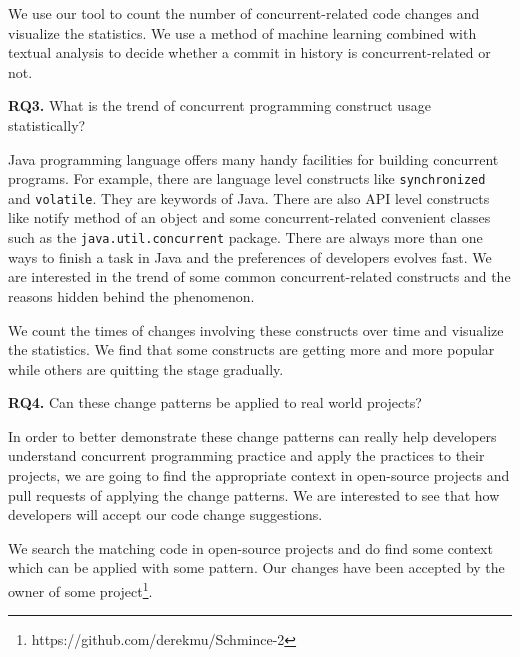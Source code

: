 We use our tool to count the number of concurrent-related code changes and visualize the statistics. We use a method of machine learning combined with textual analysis to decide whether a commit in history is concurrent-related or not.

\textbf{RQ3.} What is the trend of concurrent programming construct usage statistically?

Java programming language offers many handy facilities for building concurrent programs. For example, there are language level constructs like \texttt{synchronized} and \texttt{volatile}. They are keywords of Java. There are also API level constructs like notify method of an object and some concurrent-related convenient classes such as the \texttt{java.util.concurrent} package. There are always more than one ways to finish a task in Java and the preferences of developers evolves fast. We are interested in the trend of some common concurrent-related constructs and the reasons hidden behind the phenomenon.

We count the times of changes involving these constructs over time and visualize the statistics. We find that some constructs are getting more and more popular while others are quitting the stage gradually.

\textbf{RQ4.} Can these change patterns be applied to real world projects?

In order to better demonstrate these change patterns can really help developers understand concurrent programming practice and apply the practices to their projects, we are going to find the appropriate context in open-source projects and pull requests of applying the change patterns. We are interested to see that how developers will accept our code change suggestions.

We search the matching code in open-source projects and do find some context which can be applied with some pattern. Our changes have been accepted by the owner of some project\footnote{https://github.com/derekmu/Schmince-2}.

